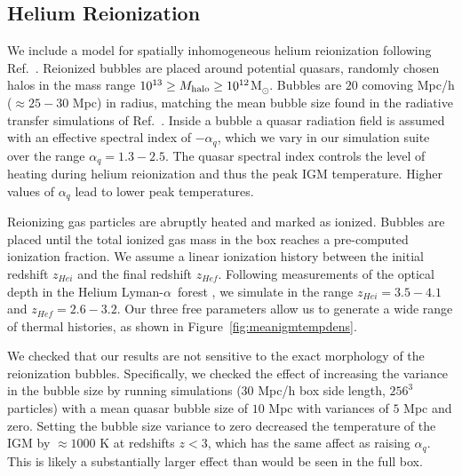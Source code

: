 \documentclass[a4paper,11pt]{article}
\newcommand{\Lya}{Lyman-$\alpha$}
\begin{document}
\subsection{Helium Reionization}
\label{sec:helium}

We include a model for spatially inhomogeneous helium reionization following Ref.~\cite{UptonSanderbeck:2020}. Reionized bubbles are placed around potential quasars, randomly chosen halos in the mass range $10^{13} \geq M_{\rm halo}\geq 10^{12}$M$_{\odot}$. Bubbles are $20$ comoving Mpc/h ($\approx 25 - 30$ Mpc) in radius, matching the mean bubble size found in the radiative transfer simulations of Ref.~\citep{McQuinn:2009}. Inside a bubble a quasar radiation field is assumed with an effective spectral index of $ - \alpha_q$, which we vary in our simulation suite over the range $\alpha_q  = 1.3 - 2.5$. The quasar spectral index controls the level of heating during helium reionization and thus the peak IGM temperature. Higher values of $\alpha_q$ lead to lower peak temperatures.

Reionizing gas particles are abruptly heated and marked as ionized. Bubbles are placed until the total ionized gas mass in the box reaches
a pre-computed ionization fraction. We assume a linear ionization history between the initial redshift $z_{Hei}$ and the final redshift $z_{Hef}$. Following measurements of the optical depth in the Helium \Lya~forest \cite{Worseck:2019}, we simulate in the range $z_{Hei} = 3.5 -  4.1$ and $z_{Hef} = 2.6 - 3.2$. Our three free parameters allow us to generate a wide range of thermal histories, as shown in Figure~\ref{fig:meanigmtempdens}.

We checked that our results are not sensitive to the exact morphology of the reionization bubbles.
Specifically, we checked the effect of increasing the variance in the bubble size by running simulations ($30$ Mpc/h box side length, $256^3$ particles) with a mean quasar bubble size of $10$ Mpc with variances of $5$ Mpc and zero.
Setting the bubble size variance to zero decreased the temperature of the IGM by $\approx 1000$ K at redshifts $z<3$, which has the same affect as raising $\alpha_q$. This is likely a substantially larger effect than would be seen in the full box.
\end{document}
